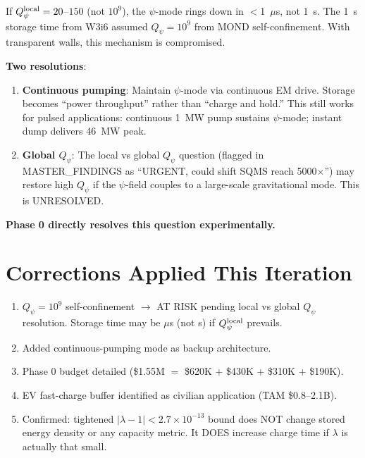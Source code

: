 \documentclass[11pt]{article}
\newcommand{\ee}[1]{\times 10^{#1}}
\newcommand{\lambdaone}{|\lambda-1|}
\begin{document}
\begin{tcolorbox}[colback=orange!5!white, colframe=orange!70!black,
  title=\textbf{WARNING: Storage Time Reassessment Needed}]
If $Q_\psi^{\rm local} = 20$--$150$ (not $10^9$), the $\psi$-mode
rings down in $<$1~$\mu$s, not 1~s. The 1~s storage time from W3i6
assumed $Q_\psi = 10^9$ from MOND self-confinement. With transparent
walls, this mechanism is compromised.

\textbf{Two resolutions}:
\begin{enumerate}
\item \textbf{Continuous pumping}: Maintain $\psi$-mode via continuous
  EM drive. Storage becomes ``power throughput'' rather than
  ``charge and hold.'' This still works for pulsed applications:
  continuous 1~MW pump sustains $\psi$-mode; instant dump delivers
  46~MW peak.
\item \textbf{Global $Q_\psi$}: The local vs global $Q_\psi$ question
  (flagged in MASTER\_FINDINGS as ``URGENT, could shift SQMS reach
  5000$\times$'') may restore high $Q_\psi$ if the $\psi$-field
  couples to a large-scale gravitational mode. This is UNRESOLVED.
\end{enumerate}

\textbf{Phase 0 directly resolves this question experimentally.}
\end{tcolorbox}

\section*{Corrections Applied This Iteration}

\begin{enumerate}
\item $Q_\psi = 10^9$ self-confinement $\to$ AT RISK pending local
  vs global $Q_\psi$ resolution. Storage time may be $\mu$s (not s)
  if $Q_\psi^{\rm local}$ prevails.
\item Added continuous-pumping mode as backup architecture.
\item Phase 0 budget detailed (\$1.55M $=$ \$620K + \$430K + \$310K + \$190K).
\item EV fast-charge buffer identified as civilian application
  (TAM \$0.8--2.1B).
\item Confirmed: tightened $\lambdaone < 2.7\ee{-13}$ bound does
  NOT change stored energy density or any capacity metric.
  It DOES increase charge time if $\lambda$ is actually that small.
\end{enumerate}
\end{document}
